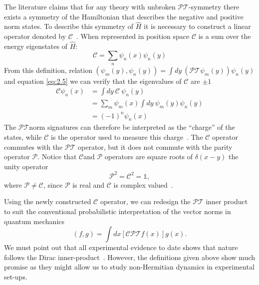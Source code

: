 \documentclass[12pt, a4paper]{report}
\newcommand\PT{\(\mathcal{PT}\)}
\newcommand\PP{\(\mathcal{P}\)}
\newcommand\CC{\(\mathcal{C}\)}
\begin{document}
The literature claims that for any theory with unbroken \PT-symmetry there exists a symmetry of the Hamiltonian that describes the negative and positive norm states. To describe this symmetry of $\hat{H}$ it is necessary to construct a linear operator denoted by \CC~\cite{MustaHbeHermitian,ComplexExtension,Bender_2004}. When represented in position space \CC\: is a sum over the energy eigenstates of $\hat{H}$:
\begin{equation}\label{eq:2.7}
\mathcal{C} = \sum_n \psi_n(x)\psi_n(y)
\end{equation}
From this definition, relation $(\psi_m(y), \psi_n(y)) = \int dy\:(\mathcal{PT}\psi_m(y))\psi_n(y)$ and equation \ref{eq:2.5} we can verify that the eigenvalues of \CC\: are $\pm 1$
\begin{align}\label{eq:2.8}
\mathcal{C} \psi_n(x) & = \int dy\:\mathcal{C}\:\psi_n(y)\nonumber \\
& = \sum_{m}\psi_m(x)\int dy\:\psi_m(y) \psi_n(y)\nonumber \\
& = (-1)^n \psi_n(x)
\end{align}
The \PT\:norm signatures can therefore be interpreted as the ``charge'' of the states, while \CC\: is the operator used to measure this charge~\cite{Bender_2004}. The \CC\: operator commutes with the \PT\: operator, but it does not commute with the parity operator \PP. Notice that \CC\:and \PP\: operators are square roots of $\delta(x-y)$ the unity operator~\cite{ComplexExtension}
\begin{equation}\label{eq:2.9}
\mathcal{P}^2 = \mathcal{C}^2 = \mathds{1}, 
\end{equation}
where $\mathcal{P} \neq \mathcal{C}$, since \PP\: is real and \CC\: is complex valued~\cite{MustaHbeHermitian, Bender_2004}.

Using the newly constructed \CC\: operator, we can redesign the \PT\: inner product to suit the conventional probabilistic interpretation of the vector norms in quantum mechanics
\begin{equation}\label{eq:2.10}
\left( f, g \right ) = \int dx \left [ \mathcal{CPT} f(x) \right ] g(x).
\end{equation}
We must point out that all experimental evidence to date shows that nature follows the Dirac inner-product~\cite{Maximal}. However, the definitions given above show much promise as they might allow us to study non-Hermitian dynamics in experimental set-ups.

\end{document}
